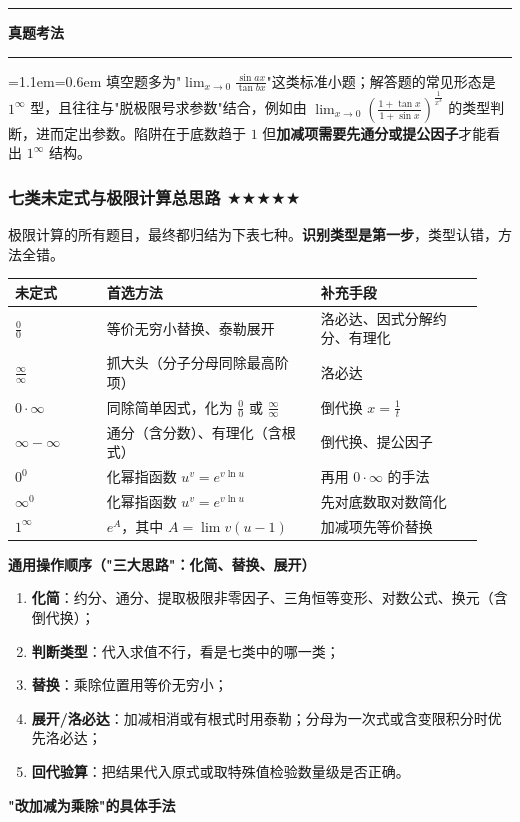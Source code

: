 \documentclass[11pt,openany,UTF8]{ctexbook}
\newcommand{\callouthead}[2]{%
  \par\addvspace{7pt}\noindent
  {\color{#1}\rule[-0.15em]{3pt}{1.05em}}\hspace{0.5em}%
  {\bfseries\color{#1}#2}\par\nobreak\vspace{-0.35em}%
  {\color{rulesep}\hrule height 0.4pt}\nobreak\vspace{0.45em}%
  \begingroup\small\setlength{\parindent}{0pt}%
  \leftskip=1.1em\rightskip=0.6em\noindent\ignorespaces}
\newcommand{\calloutend}{\par\endgroup\addvspace{7pt}}
\newenvironment{callexam}[1]{\callouthead{exambar}{#1}}{\calloutend}
\begin{document}
\begin{callexam}{真题考法}
填空题多为"$\lim_{x\to 0}\frac{\sin ax}{\tan bx}$"这类标准小题；解答题的常见形态是 $1^\infty$ 型，且往往与"脱极限号求参数"结合，例如由 $\lim_{x\to 0}\left(\frac{1+\tan x}{1+\sin x}\right)^{\frac{1}{x^{3}}}$ 的类型判断，进而定出参数。陷阱在于底数趋于 $1$ 但\textbf{加减项需要先通分或提公因子}才能看出 $1^\infty$ 结构。

\end{callexam}

\subsubsection{七类未定式与极限计算总思路 $\bigstar$$\bigstar$$\bigstar$$\bigstar$$\bigstar$}

极限计算的所有题目，最终都归结为下表七种。\textbf{识别类型是第一步}，类型认错，方法全错。

\begingroup\small\setlength{\tabcolsep}{4.0pt}
\begin{longtable}{@{}L{0.1801\linewidth}L{0.4277\linewidth}L{0.3208\linewidth}@{}}
\toprule
\textbf{未定式} & \textbf{首选方法} & \textbf{补充手段} \\
\midrule
\endhead
$\frac00$ & 等价无穷小替换、泰勒展开 & 洛必达、因式分解约分、有理化 \\
$\frac{\infty}{\infty}$ & 抓大头（分子分母同除最高阶项） & 洛必达 \\
$0\cdot\infty$ & 同除简单因式，化为 $\frac00$ 或 $\frac{\infty}{\infty}$ & 倒代换 $x=\frac1t$ \\
$\infty-\infty$ & 通分（含分数）、有理化（含根式） & 倒代换、提公因子 \\
$0^{0}$ & 化幂指函数 $u^{v}=e^{v\ln u}$ & 再用 $0\cdot\infty$ 的手法 \\
$\infty^{0}$ & 化幂指函数 $u^{v}=e^{v\ln u}$ & 先对底数取对数简化 \\
$1^{\infty}$ & $e^{A}$，其中 $A=\lim v(u-1)$ & 加减项先等价替换 \\
\bottomrule
\end{longtable}
\endgroup

\textbf{通用操作顺序（"三大思路"：化简、替换、展开）}

\begin{enumerate}
\item \textbf{化简}：约分、通分、提取极限非零因子、三角恒等变形、对数公式、换元（含倒代换）；
\item \textbf{判断类型}：代入求值不行，看是七类中的哪一类；
\item \textbf{替换}：乘除位置用等价无穷小；
\item \textbf{展开/洛必达}：加减相消或有根式时用泰勒；分母为一次式或含变限积分时优先洛必达；
\item \textbf{回代验算}：把结果代入原式或取特殊值检验数量级是否正确。
\end{enumerate}
\textbf{"改加减为乘除"的具体手法}
\end{document}
